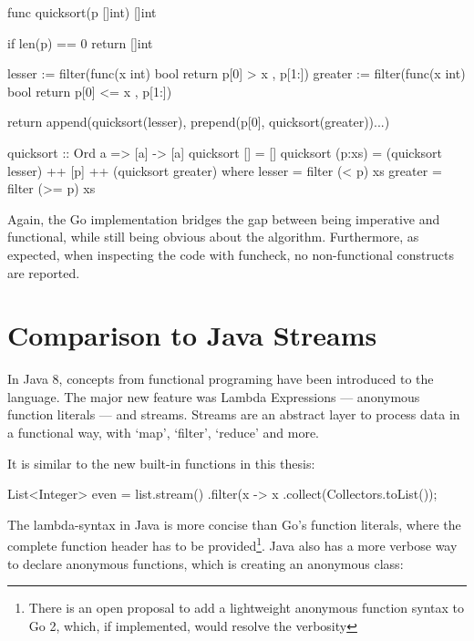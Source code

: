 \begin{code}
	\begin{gocode}
func quicksort(p []int) []int {
	if len(p) == 0 {
		return []int{}
	}

	lesser := filter(func(x int) bool { return p[0] > x }, p[1:])
	greater := filter(func(x int) bool { return p[0] <= x }, p[1:])

	return append(quicksort(lesser), prepend(p[0], quicksort(greater))...)
}
\end{gocode}
\begin{haskellcode}
quicksort :: Ord a => [a] -> [a]
quicksort []     = []
quicksort (p:xs) = (quicksort lesser) ++ [p] ++ (quicksort greater)
    where
        lesser  = filter (< p) xs
        greater = filter (>= p) xs
\end{haskellcode}
\end{code}

Again, the Go implementation bridges the gap between being imperative and functional,
while still being obvious about the algorithm.
Furthermore, as expected, when inspecting the code with funcheck, no non-functional
constructs are reported.

\section{Comparison to Java Streams}

In Java 8, concepts from functional programing have been introduced to the language.
The major new feature was Lambda Expressions --- anonymous function literals --- and
streams. Streams are an abstract layer to process data in a functional way, with `map',
`filter', `reduce' and more.

It is similar to the new built-in functions in this thesis:

\begin{code}
	\begin{javacode}
List<Integer> even = list.stream()
	.filter(x -> x %
	.collect(Collectors.toList());
	\end{javacode}
\end{code}

The lambda-syntax in Java is more concise than Go's function literals, where the
complete function header has to be provided\footnote{There is an open proposal
	to add a lightweight anonymous function syntax to Go 2, which, if implemented,
would resolve the verbosity\autocite{go-lambdas}}. Java also has a more verbose way
to declare anonymous functions, which is creating an anonymous class:

